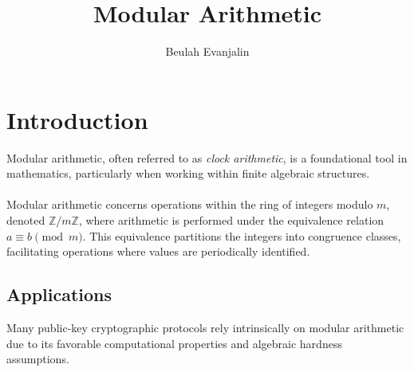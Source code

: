 \documentclass[12pt,openany]{book}
\title{Modular Arithmetic}
\author{Beulah Evanjalin}
\date{}
\theoremstyle{definition}
\theoremstyle{plain}
\theoremstyle{remark}
\begin{document}
\maketitle
\tableofcontents

\chapter{Introduction}

Modular arithmetic, often referred to as \emph{clock arithmetic}, is a foundational tool in mathematics, particularly when working within finite algebraic structures.
\\ \\
Modular arithmetic concerns operations within the ring of integers modulo $m$, denoted $\mathbb{Z}/m\mathbb{Z}$, where arithmetic is performed under the equivalence relation $a \equiv b \pmod{m}$. This equivalence partitions the integers into congruence classes, facilitating operations where values are periodically identified.

\section{Applications}

Many public-key cryptographic protocols rely intrinsically on modular arithmetic due to its favorable computational properties and algebraic hardness assumptions.
\end{document}
